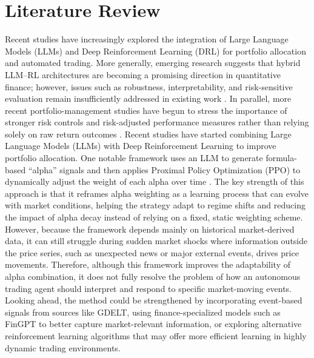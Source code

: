 \documentclass[a4paper,fleqn]{cas-sc}
\begin{document}
\section{Literature Review}\label{sec:lr}
Recent studies have increasingly explored the integration of Large Language Models (LLMs) and Deep Reinforcement Learning (DRL) for portfolio allocation and automated trading. More generally, emerging research suggests that hybrid LLM–RL architectures are becoming a promising direction in quantitative finance; however, issues such as robustness, interpretability, and risk-sensitive evaluation remain insufficiently addressed in existing work \cite{nines} \cite{ten}. In parallel, more recent portfolio-management studies have begun to stress the importance of stronger risk controls and risk-adjusted performance measures rather than relying solely on raw return outcomes \cite{eleven} \cite{twevel}.
Recent studies have started combining Large Language Models (LLMs) with Deep Reinforcement Learning to improve portfolio allocation. One notable framework uses an LLM to generate formula-based “alpha” signals and then applies Proximal Policy Optimization (PPO) to dynamically adjust the weight of each alpha over time \cite{thirteen}. The key strength of this approach is that it reframes alpha weighting as a learning process that can evolve with market conditions, helping the strategy adapt to regime shifts and reducing the impact of alpha decay instead of relying on a fixed, static weighting scheme. However, because the framework depends mainly on historical market-derived data, it can still struggle during sudden market shocks where information outside the price series, such as unexpected news or major external events, drives price movements. Therefore, although this framework improves the adaptability of alpha combination, it does not fully resolve the problem of how an autonomous trading agent should interpret and respond to specific market-moving events. Looking ahead, the method could be strengthened by incorporating event-based signals from sources like GDELT, using finance-specialized models such as FinGPT to better capture market-relevant information, or exploring alternative reinforcement learning algorithms that may offer more efficient learning in highly dynamic trading environments. 
\end{document}
